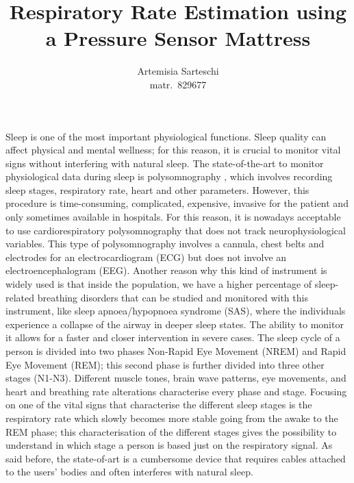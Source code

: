\documentclass[a4paper,11pt, oneside,italian]{article}
\title{Respiratory Rate Estimation using a Pressure Sensor Mattress}
\author{Artemisia Sarteschi\\\smaller matr.~829677}
\date{}
\begin{document}
\maketitle
{}
\noindent


Sleep is one of the most important physiological functions. Sleep quality can affect physical 
and mental wellness; for this reason,
it is crucial to monitor vital signs without interfering with natural sleep. 
The state-of-the-art to monitor physiological data during sleep is polysomnography%
, which involves recording sleep stages, respiratory rate, heart and other parameters. However, this procedure is time-consuming, 
complicated, expensive, invasive for the patient and only sometimes available in hospitals. For this reason, it is nowadays 
acceptable to use cardiorespiratory polysomnography that does not track neurophysiological variables. This type of polysomnography
involves a cannula, chest belts and electrodes for an electrocardiogram (ECG) but does not involve an electroencephalogram (EEG).
Another reason why this kind of instrument is widely used is that inside the population, we have a higher percentage of 
sleep-related breathing disorders that can be studied and monitored with this instrument, like sleep apnoea/hypopnoea syndrome (SAS), where the individuals experience a collapse 
of the airway in deeper sleep states. The ability to monitor it allows for a faster and closer intervention in severe cases. 
The sleep cycle of a person is divided into two phases Non-Rapid Eye Movement (NREM) and Rapid Eye Movement (REM);
this second phase is further divided into three other stages (N1-N3). Different muscle tones, brain wave patterns, 
eye movements, and heart and breathing rate alterations characterise every phase and stage.
Focusing on one of the vital signs that characterise the different sleep stages is the respiratory rate 
which slowly becomes more stable going from the awake to the REM phase; this characterisation of the different stages gives the possibility to 
understand in which stage a person is based just on the respiratory signal.
As said before, the state-of-art is a cumbersome device that 
requires cables attached to the users' bodies and often interferes with 
natural sleep. 
\end{document}
